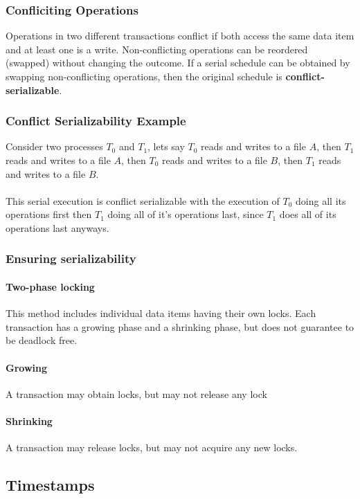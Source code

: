 \documentclass{article}
\begin{document}
\subsubsection{Confliciting Operations}

Operations in two different transactions conflict if both access the same data item and at least one is a write. Non-conflicting operations can be reordered (swapped) without changing the outcome. If a serial schedule can be obtained by swapping non-conflicting operations, then the original schedule is \textbf{conflict-serializable}.

\subsubsection{Conflict Serializability Example}

Consider two processes $T_0$ and $T_1$, lets say $T_0$ reads and writes to a file $A$, then $T_1$ reads and writes to a file $A$, then $T_0$ reads and writes to a file $B$, then $T_1$ reads and writes to a file $B$.
\\
\\
This serial execution is conflict serializable with the execution of $T_0$ doing all its operations first then $T_1$ doing all of it's operations last, since $T_1$ does all of its operations last anyways.

\subsubsection{Ensuring serializability}

\paragraph{Two-phase locking} This method includes individual data items having their own locks. Each transaction has a growing phase and a shrinking phase, but does not guarantee to be deadlock free.
\paragraph{Growing} A transaction may obtain locks, but may not release any lock
\paragraph{Shrinking} A transaction may release locks, but may not acquire any new locks.

\subsection{Timestamps}
\end{document}
